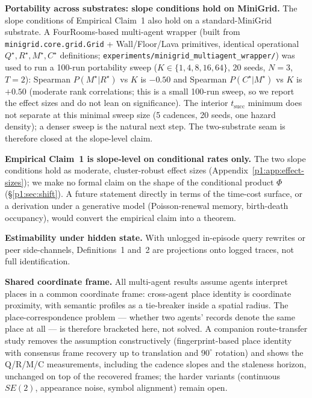 \documentclass{article}
\begin{document}
\textbf{Portability across substrates: slope conditions hold on MiniGrid.} The slope conditions of Empirical Claim~1 also hold on a standard-MiniGrid substrate. A FourRooms-based multi-agent wrapper (built from \texttt{minigrid.core.grid.Grid} + Wall/Floor/Lava primitives, identical operational $Q^\star,R^\star,M^\star,C^\star$ definitions; \texttt{experiments/minigrid\_multiagent\_wrapper/}) was used to run a 100-run portability sweep ($K{\in}\{1,4,8,16,64\}$, 20 seeds, $N{=}3$, $T{=}2$): Spearman $P(M^\star|R^\star)$ vs $K$ is $-0.50$ and Spearman $P(C^\star|M^\star)$ vs $K$ is $+0.50$ (moderate rank correlations; this is a small 100-run sweep, so we report the effect sizes and do not lean on significance). The interior $t_{\mathrm{succ}}$ minimum does not separate at this minimal sweep size (5 cadences, 20 seeds, one hazard density); a denser sweep is the natural next step. The two-substrate seam is therefore closed at the slope-level claim.

\textbf{Empirical Claim~1 is slope-level on conditional rates only.} The two slope conditions hold as moderate, cluster-robust effect sizes (Appendix~\ref{p1:app:effect-sizes}); we make no formal claim on the shape of the conditional product $\Phi$ (\S\ref{p1:sec:shift}). A future statement directly in terms of the time-cost surface, or a derivation under a generative model (Poisson-renewal memory, birth-death occupancy), would convert the empirical claim into a theorem.

\textbf{Estimability under hidden state.} With unlogged in-episode query rewrites or peer side-channels, Definitions~1 and~2 are projections onto logged traces, not full identification.

\textbf{Shared coordinate frame.} All multi-agent results assume agents
interpret places in a common coordinate frame: cross-agent place
identity is coordinate proximity, with semantic profiles as a
tie-breaker inside a spatial radius. The place-correspondence problem
--- whether two agents' records denote the same place at all --- is
therefore bracketed here, not solved. A companion route-transfer study \citep{songlines2} removes
the assumption constructively (fingerprint-based place identity with
consensus frame recovery up to translation and $90^\circ$ rotation)
and shows the Q/R/M/C measurements, including the cadence slopes and
the staleness horizon, unchanged on top of the recovered frames; the
harder variants (continuous $SE(2)$, appearance noise, symbol
alignment) remain open.
\end{document}
